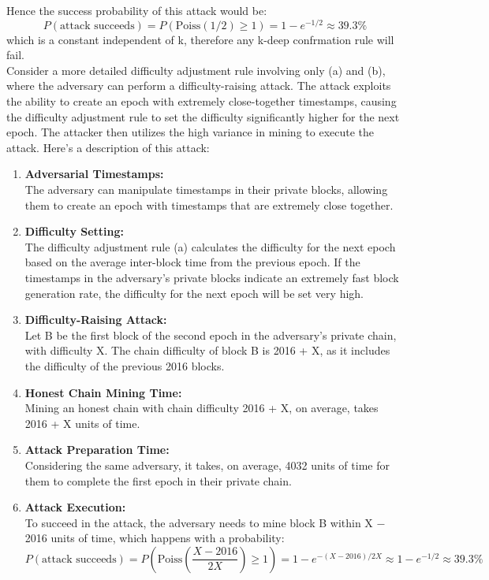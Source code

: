 \documentclass{report}
\begin{document}
Hence the success probability of this attack would be:\\
\begin{equation*}
	P(\text{attack succeeds}) = P(\text{Poiss}(1/2) \geq 1) = 1 - e^{-1/2} \approx 39.3\%
\end{equation*}
which is a constant independent of k, therefore any k-deep confrmation rule will fail.\\
Consider a more detailed difficulty adjustment rule involving only (a) and (b), where the adversary can perform a difficulty-raising attack. The attack exploits the ability to create an epoch with extremely close-together timestamps, causing the difficulty adjustment rule to set the difficulty significantly higher for the next epoch. The attacker then utilizes the high variance in mining to execute the attack. Here's a description of this attack:
\begin{enumerate}
	\item \textbf{Adversarial Timestamps:} \\The adversary can manipulate timestamps in their private blocks, allowing them to create an epoch with timestamps that are extremely close together.
	\item \textbf{Difficulty Setting:}\\The difficulty adjustment rule (a) calculates the difficulty for the next epoch based on the average inter-block time from the previous epoch. If the timestamps in the adversary's private blocks indicate an extremely fast block generation rate, the difficulty for the next epoch will be set very high.
	\item \textbf{Difficulty-Raising Attack:}\\Let B be the first block of the second epoch in the adversary's private chain, with difficulty X. The chain difficulty of block B is 2016 + X, as it includes the difficulty of the previous 2016 blocks.
	\item \textbf{Honest Chain Mining Time:}\\Mining an honest chain with chain difficulty 2016 + X, on average, takes 2016 + X units of time.
	\item \textbf{Attack Preparation Time:}\\Considering the same adversary, it takes, on average, 4032 units of time for them to complete the first epoch in their private chain.
	\item \textbf{Attack Execution:}\\To succeed in the attack, the adversary needs to mine block B within X − 2016 units of time, which happens with a probability:\begin{equation*}
		P(\text{attack succeeds}) = P(\text{Poiss}\left(\frac{X-2016}{2X}\right) \geq 1) = 1 - e^{-(X-2016)/2X} \approx 1 - e^{-1/2} \approx 39.3\%
	\end{equation*}
	
\end{enumerate}
\end{document}
